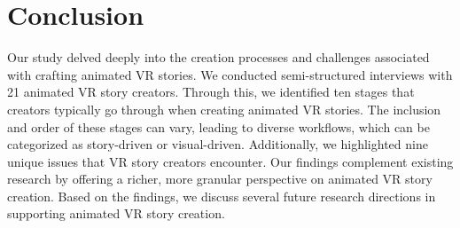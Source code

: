 \section{Conclusion}

Our study delved deeply into the creation processes and challenges associated with crafting animated VR stories. We conducted semi-structured interviews with 21 animated VR story creators. Through this, we identified ten stages that creators typically go through when creating animated VR stories. The inclusion and order of these stages can vary, leading to diverse workflows, which can be categorized as story-driven or visual-driven. Additionally, we highlighted nine unique issues that VR story creators encounter. Our findings complement existing research by offering a richer, more granular perspective on animated VR story creation. Based on the findings, we discuss several future research directions in supporting animated VR story creation.
